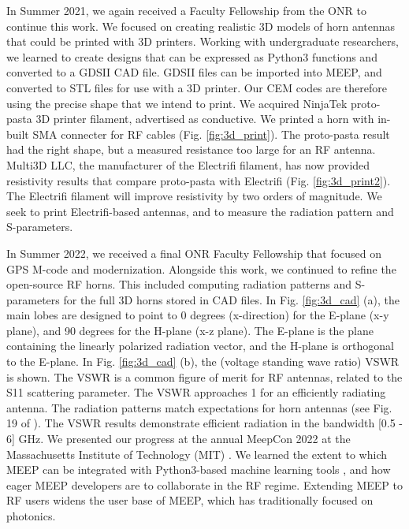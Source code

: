 \documentclass[../../main.tex]{subfiles}
\begin{document}
In Summer 2021, we again received a Faculty Fellowship from the ONR to continue this work.  We focused on creating realistic 3D models of horn antennas that could be printed with 3D printers.  Working with undergraduate researchers, we learned to create designs that can be expressed as Python3 functions and converted to a GDSII CAD file.  GDSII files can be imported into MEEP, and converted to STL files for use with a 3D printer.  Our CEM codes are therefore using the precise shape that we intend to print.  We acquired NinjaTek proto-pasta 3D printer filament, advertised as conductive.  We printed a horn with in-built SMA connecter for RF cables (Fig. \ref{fig:3d_print}). The proto-pasta result had the right shape, but a measured resistance too large for an RF antenna.  Multi3D LLC, the manufacturer of the Electrifi filament, has now provided resistivity results that compare proto-pasta with Electrifi (Fig. \ref{fig:3d_print2}).  The Electrifi filament will improve resistivity by two orders of magnitude.  We seek to print Electrifi-based antennas, and to measure the radiation pattern and S-parameters. \\ \vspace{2.5mm}

In Summer 2022, we received a final ONR Faculty Fellowship that focused on GPS M-code and modernization.  Alongside this work, we continued to refine the open-source RF horns.  This included computing radiation patterns and S-parameters for the full 3D horns stored in CAD files.  In Fig. \ref{fig:3d_cad} (a), the main lobes are designed to point to 0 degrees (x-direction) for the E-plane (x-y plane), and 90 degrees for the H-plane (x-z plane).  The E-plane is the plane containing the linearly polarized radiation vector, and the H-plane is orthogonal to the E-plane.  In Fig. \ref{fig:3d_cad} (b), the (voltage standing wave ratio) VSWR is shown.  The VSWR is a common figure of merit for RF antennas, related to the S11 scattering parameter.  The VSWR approaches 1 for an efficiently radiating antenna.  The radiation patterns match expectations for horn antennas (see Fig. 19 of \cite{8786183}).  The VSWR results demonstrate efficient radiation in the bandwidth [0.5 - 6] GHz.  We presented our progress at the annual MeepCon 2022 at the Massachusetts Institute of Technology (MIT) \cite{meepcon2022}.  We learned the extent to which MEEP can be integrated with Python3-based machine learning tools \cite{meepcon2022_2}, and how eager MEEP developers are to collaborate in the RF regime.  Extending MEEP to RF users widens the user base of MEEP, which has traditionally focused on photonics. \\ \vspace{2.5mm}
\end{document}
